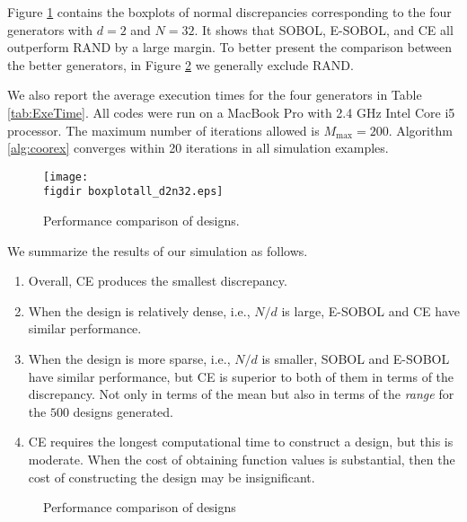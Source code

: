\documentclass[graybox]{svmult}
\newcommand{\figdir}{code/} %
\begin{document}
Figure \ref{fig:SOBOLVsRAND} contains the boxplots of normal discrepancies corresponding to the four generators with $d=2$ and $N=32$. It shows that SOBOL, E-SOBOL, and CE all outperform RAND by a large margin. To better present the comparison between the better generators, in Figure \ref{fig:comparison} we generally exclude RAND.

We also report the average execution times for the four generators in Table \ref{tab:ExeTime}. All codes were run on a MacBook Pro with 2.4 GHz Intel Core i5 processor. The maximum number of iterations allowed is $M_{\max} = 200$.  Algorithm \ref{alg:coorex} converges within 20 iterations in all simulation examples.


\begin{figure}[ht]
\begin{center}
\texttt{[image: \\figdir boxplotall\_d2n32.eps]}
\caption{Performance comparison of designs. \label{fig:SOBOLVsRAND}}
\end{center}
\end{figure}

 We summarize the results of our simulation as follows. 
\begin{enumerate}
\item
Overall, CE produces the smallest discrepancy.
\item 
When the design is relatively dense, i.e., $N/d$ is large, E-SOBOL and CE have similar performance.
\item
When the design is more sparse, i.e., $N/d$ is smaller, SOBOL and E-SOBOL have similar performance, but CE is superior to both of them in terms of the discrepancy. Not only in terms of the mean but also in terms of the \emph{range} for the $500$ designs generated.

\item CE requires the longest computational time to construct a design, but this is moderate.  When the cost of obtaining function values is substantial, then the cost of constructing the design may be insignificant.  
\end{enumerate}

\begin{figure}[ht]
\centering
{}
\quad
{}
\quad
{}
\quad
{}
\quad
{}
\quad
{}
\caption{Performance comparison of designs \label{fig:comparison}}
\end{figure}
\end{document}
